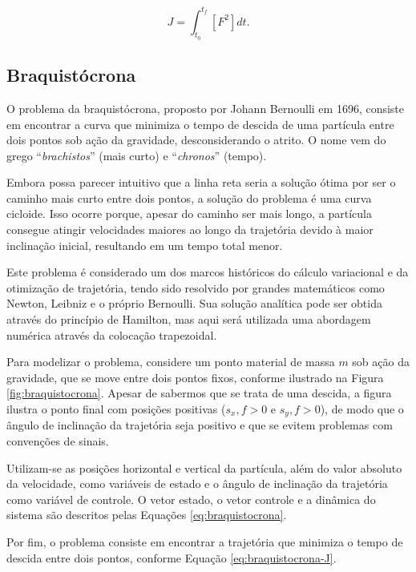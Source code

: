 \begin{equation}
    J = \int_{t_0}^{t_f} \left[ F^2 \right] dt.
    \label{eq:movimento-simples-J}
\end{equation}

\subsection{Braquistócrona}
\label{subsec:braquistocrona}

O problema da braquistócrona, proposto por Johann Bernoulli em 1696, consiste em encontrar a curva que minimiza o tempo de descida de uma partícula entre dois pontos sob ação da gravidade, desconsiderando o atrito. O nome vem do grego ``\textit{brachistos}'' (mais curto) e ``\textit{chronos}'' (tempo).

Embora possa parecer intuitivo que a linha reta seria a solução ótima por ser o caminho mais curto entre dois pontos, a solução do problema é uma curva cicloide. Isso ocorre porque, apesar do caminho ser mais longo, a partícula consegue atingir velocidades maiores ao longo da trajetória devido à maior inclinação inicial, resultando em um tempo total menor.

Este problema é considerado um dos marcos históricos do cálculo variacional e da otimização de trajetória, tendo sido resolvido por grandes matemáticos como Newton, Leibniz e o próprio Bernoulli. Sua solução analítica pode ser obtida através do princípio de Hamilton, mas aqui será utilizada uma abordagem numérica através da colocação trapezoidal.

Para modelizar o problema, considere um ponto material de massa $m$ sob ação da gravidade, que se move entre dois pontos fixos, conforme ilustrado na Figura \ref{fig:braquistocrona}. Apesar de sabermos que se trata de uma descida, a figura ilustra o ponto final com posições positivas ($s_x,f > 0$ e $s_y,f > 0$), de modo que o ângulo de inclinação da trajetória seja positivo e que se evitem problemas com convenções de sinais.

Utilizam-se as posições horizontal e vertical da partícula, além do valor absoluto da velocidade, como variáveis de estado e o ângulo de inclinação da trajetória como variável de controle. O vetor estado, o vetor controle e a dinâmica do sistema são descritos pelas Equações \ref{eq:braquistocrona}.

Por fim, o problema consiste em encontrar a trajetória que minimiza o tempo de descida entre dois pontos, conforme Equação \ref{eq:braquistocrona-J}.

